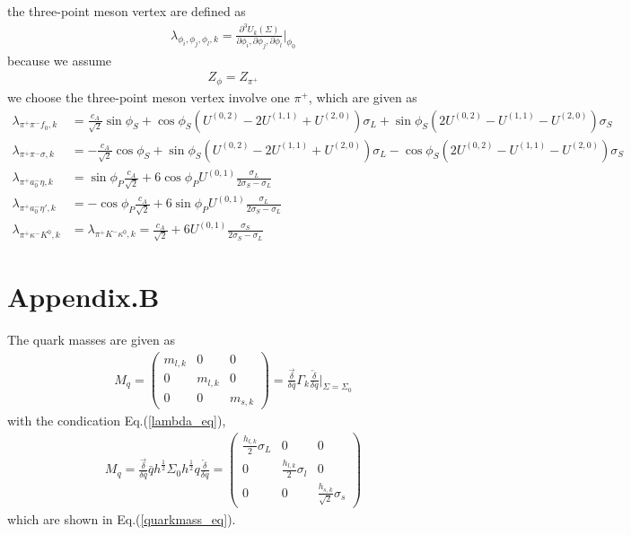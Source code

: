 \documentclass[12pt]{article}
\begin{document}
the three-point meson vertex are defined as
\begin{align}
\lambda_{\phi_i,\phi_j,\phi_l,k}=\frac{\partial^3 U_k(\Sigma)}{\partial \phi_i,\partial \phi_j,\partial \phi_l}\bigg |_{\phi_0}
\end{align}
because we assume
\begin{align}
Z_\phi=Z_{\pi^+}
\end{align}
we choose the three-point meson vertex involve one $\pi^+$, which are given as
\begin{align}
\lambda_{\pi^+\pi^-f_0,k}&=\frac{c_A}{\sqrt{2}} \sin\phi_S+\cos\phi_S(U^{(0,2)} - 2 U^{(1,1)} + U^{(2,0)}) \sigma_L+\sin\phi_S(2 U^{(0,2)} - U^{(1,1)} - U^{(2,0)})  \sigma_S\\
\lambda_{\pi^+\pi^-\sigma,k}&=-\frac{c_A}{\sqrt{2}} \cos\phi_S+\sin\phi_S(U^{(0,2)} - 2 U^{(1,1)} + U^{(2,0)}) \sigma_L-\cos\phi_S(2 U^{(0,2)} - U^{(1,1)} - U^{(2,0)})  \sigma_S\\
\lambda_{\pi^+a_0^-\eta,k}&=\sin\phi_P \frac{c_A} {\sqrt{2}} + 6 \cos\phi_PU^{(0,1)} \frac{ \sigma_L}{2 \sigma_S-\sigma_L}\\
\lambda_{\pi^+a_0^-\eta',k}&=-\cos\phi_P\frac{c_A}{\sqrt{2}} +6 \sin\phi_P U^{(0,1)} \frac{\sigma_L}{2 \sigma_S-\sigma_L}\\
\lambda_{\pi^+\kappa^-K^0,k}&=\lambda_{\pi^+K^-\kappa^0,k}=\frac{c_A}{\sqrt{2}} +6 U^{(0,1)} \frac{\sigma_S}{2 \sigma_S-\sigma_L}
\end{align}

\section{Appendix.B}\label{appx_B}

The quark masses are given as
\begin{align}
M_q
=\begin{pmatrix} 
m_{l,k}&0&0\\
0&m_{l,k}&0\\
0&0&m_{s,k}
\end{pmatrix} 
=\frac{\overrightarrow{\delta}}{\delta \bar q}\Gamma_k\frac{\overleftarrow{\delta}}{\delta q}\Bigg|_{\Sigma=\Sigma_0}
\end{align}
with the condication Eq.(\ref{lambda_eq}),
\begin{align}
M_q
=\frac{\overrightarrow{\delta}}{\delta \bar q}\bar q h^{\frac{1}{2}} \Sigma_0 h^{\frac{1}{2}} q \frac{\overleftarrow{\delta}}{\delta q}
=\begin{pmatrix} 
\frac{h_{l,k}}{2}\sigma_L&0&0\\
0&\frac{h_{l,k}}{2}\sigma_l&0\\
0&0&\frac{h_{s,k}}{\sqrt{2}}\sigma_s
\end{pmatrix} 
\end{align}
which are shown in Eq.(\ref{quarkmass_eq}).
\end{document}

